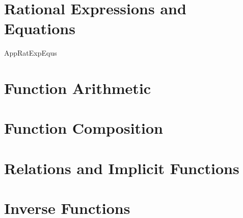 \begin{comment}
\section{Graphs of Functions}



\newpage
\end{comment}
\section{Rational Expressions and Equations}

{AppRatExpEqus}

\newpage

\section{Function Arithmetic}



\newpage

\section{Function Composition}



\newpage

\begin{comment}
\section{Transformations of Graphs}



\newpage
\end{comment}

\section{Relations and Implicit Functions}



\newpage

\section{Inverse Functions}



\newpage
